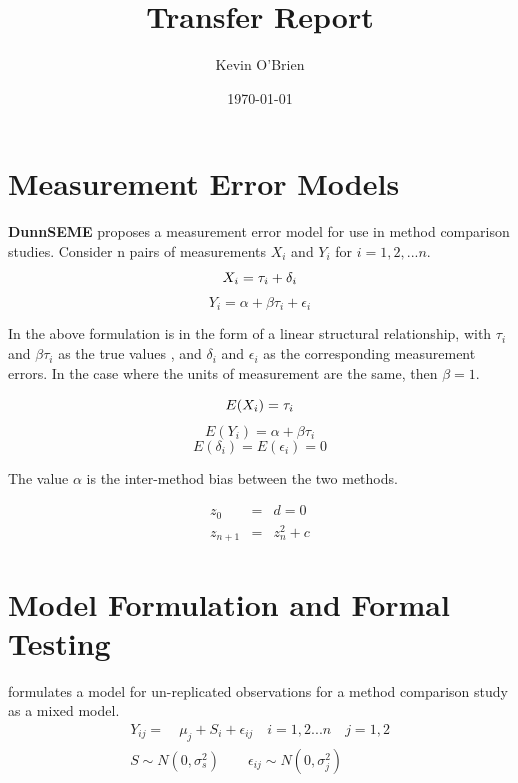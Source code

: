 \documentclass[12pt, a4paper]{article}
\begin{document}
\author{Kevin O'Brien}
\title{Transfer Report}
\date{\today}
\maketitle
\newpage
	
	\section{Measurement Error Models}
	\textbf{DunnSEME} proposes a measurement error model for use in
	method comparison studies. Consider n pairs of measurements
	$X_{i}$ and $Y_{i}$ for $i=1,2,...n$.
	\begin{equation}
		X_{i} = \tau_{i}+\delta_{i}\\
	\end{equation}
	\begin{equation}
		Y_{i} = \alpha +\beta\tau_{i}+\epsilon_{i} \nonumber
	\end{equation}
	
	In the above formulation is in the form of a linear structural
	relationship, with $\tau_{i}$ and $\beta\tau_{i}$ as the true
	values , and $\delta_{i}$ and $\epsilon_{i}$ as the corresponding
	measurement errors. In the case where the units of measurement are
	the same, then $\beta =1$.
	
	\begin{equation}
		E(X_{i}) = \tau_{i}\\
	\end{equation}
	\begin{equation}
		E(Y_{i}) = \alpha +\beta\tau_{i} \nonumber
	\end{equation}
	\begin{equation}
		E(\delta_{i}) = E(\epsilon_{i}) = 0 \nonumber
	\end{equation}
	
	The value $\alpha$ is the inter-method bias between the two
	methods.
	
	\begin{eqnarray}
		z_0 &=& d = 0 \\
		z_{n+1} &=& z_n^2+c
	\end{eqnarray}
	
	\section{Model Formulation and Formal Testing}
	
	\citet{Kinsella} formulates a model for un-replicated observations
	for a method comparison study as a mixed model.
	\begin{eqnarray}
		Y_{ij} =\quad \mu_{j} + S_{i} + \epsilon_{ij} \quad i=1,2...n\quad
		j=1,2\\
		S \sim N(0,\sigma^{2}_{s})\qquad \epsilon_{ij} \sim
		N(0,\sigma^{2}_{j}) \nonumber
	\end{eqnarray}
	
\end{document}
